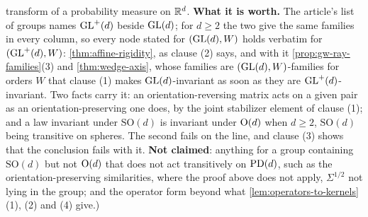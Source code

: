 \begin{proposition}
{transform of a probability measure on $\mathbb{R}^d$. \textbf{What it is worth.} The article's list of groups
names $\mathrm{GL}^+(d)$ beside $\mathrm{GL}(d)$; for $d \ge 2$ the two give the same families in every column, so every
node stated for $(\mathrm{GL}(d), W)$ holds verbatim for $(\mathrm{GL}^+(d), W)$: \ref{thm:affine-rigidity}, as clause
(2) says, and with it \ref{prop:gw-ray-families}(3) and \ref{thm:wedge-axis}, whose families are
$(\mathrm{GL}(d), W)$-families for orders $W$ that clause (1) makes $\mathrm{GL}(d)$-invariant as soon as they are
$\mathrm{GL}^+(d)$-invariant. Two facts carry it: an orientation-reversing matrix acts on a given pair as an
orientation-preserving one does, by the joint stabilizer element of clause (1); and a law invariant
under $\mathrm{SO}(d)$ is invariant under $\mathrm{O}(d)$ when $d \ge 2$, $\mathrm{SO}(d)$ being transitive
on spheres. The second fails on the line, and clause (3) shows that the conclusion fails with it.
\textbf{Not claimed}: anything for a group containing $\mathrm{SO}(d)$ but not $\mathrm{O}(d)$ that does not
act transitively on $\mathrm{PD}(d)$, such as the orientation-preserving similarities, where the proof above
does not apply, $\Sigma^{1/2}$ not lying in the group; and the operator form beyond what
\ref{lem:operators-to-kernels}(1), (2) and (4) give.)}
\end{proposition}

